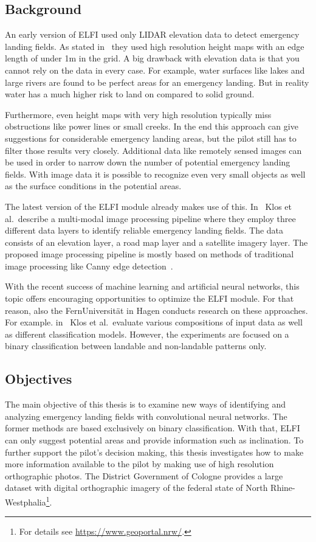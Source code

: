 \subsection{Background}
An early version of ELFI used only LIDAR elevation data to detect emergency landing fields. As stated in~\cite{feu_elfi} they used high resolution height maps with an edge length of under 1m in the grid. A big drawback with elevation data is that you cannot rely on the data in every case. For example, water surfaces like lakes and large rivers are found to be perfect areas for an emergency landing. But in reality water has a much higher risk to land on compared to solid ground.

Furthermore, even height maps with very high resolution typically miss obstructions like power lines or small creeks. In the end this approach can give suggestions for considerable emergency landing areas, but the pilot still has to filter those results very closely. Additional data like remotely sensed images can be used in order to narrow down the number of potential emergency landing fields. With image data it is possible to recognize even very small objects as well as the surface conditions in the potential areas.

The latest version of the ELFI module already makes use of this. In~\cite{elfi_pipeline19} Klos et al.\ describe a multi-modal image processing pipeline where they employ three different data layers to identify reliable emergency landing fields. The data consists of an elevation layer, a road map layer and a satellite imagery layer. The proposed image processing pipeline is mostly based on methods of traditional image processing like Canny edge detection~\cite{canny_edge86}.

With the recent success of machine learning and artificial neural networks, this topic offers encouraging opportunities to optimize the ELFI module. For that reason, also the FernUniversität in Hagen conducts research on these approaches. For example. in~\cite{elfi_transfer20} Klos et al.\ evaluate various compositions of input data as well as different classification models. However, the experiments are focused on a binary classification between landable and non-landable patterns only.

\subsection{Objectives}
The main objective of this thesis is to examine new ways of identifying and analyzing emergency landing fields with convolutional neural networks. The former methods are based exclusively on binary classification. With that, ELFI can only suggest potential areas and provide information such as inclination. To further support the pilot's decision making, this thesis investigates how to make more information available to the pilot by making use of high resolution orthographic photos. The District Government of Cologne provides a large dataset with digital orthographic imagery of the federal state of North Rhine-Westphalia\footnote{For details see \url{https://www.geoportal.nrw/}.}.

